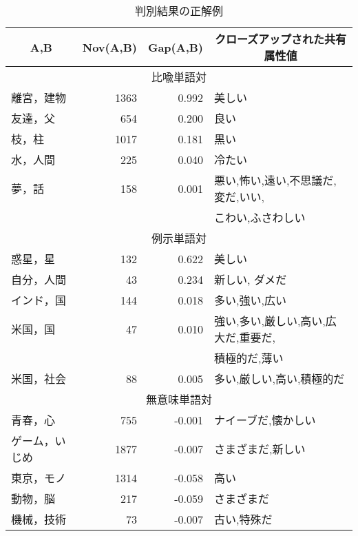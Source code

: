 \begin{table}[tb]
\begin{center}
\caption{判別結果の正解例}
\label{tbl:correct}
\begin{tabular}{|l|r|r|l|}
\hline
\multicolumn{1}{|c|}{A,B}&Nov(A,B)&Gap(A,B)&\multicolumn{1}{|c|}{クローズアップされた共有属性値}\\
\hline
\multicolumn{4}{|c|}{比喩単語対}\\
\hline
離宮，建物	&1363   &0.992  &美しい\\
友達，父       &654    &0.200  &良い\\
枝，柱         &1017   &0.181  &黒い\\
水，人間       &225    &0.040  &冷たい\\
夢，話	&158    &0.001  &悪い,怖い,遠い,不思議だ,変だ,いい,\\
	&	&	&こわい,ふさわしい\\
\hline
\multicolumn{4}{|c|}{例示単語対}\\
\hline
惑星，星       &132    &0.622  &美しい\\
自分，人間     &43     &0.234  &新しい, ダメだ\\
インド，国     &144    &0.018  &多い,強い,広い\\
米国，国       &47     &0.010  &強い,多い,厳しい,高い,広大だ,重要だ,\\
		&	&	&積極的だ,薄い\\
米国，社会     &88     &0.005  &多い,厳しい,高い,積極的だ\\
\hline
\multicolumn{4}{|c|}{無意味単語対}\\
\hline
青春，心       &755    &-0.001 &ナイーブだ,懐かしい\\
ゲーム，いじめ &1877   &-0.007 &さまざまだ,新しい\\
東京，モノ     &1314   &-0.058 &高い\\
動物，脳       &217    &-0.059 &さまざまだ\\
機械，技術     &73     &-0.007 &古い,特殊だ\\
\hline
\end{tabular}
\end{center}
\end{table}
